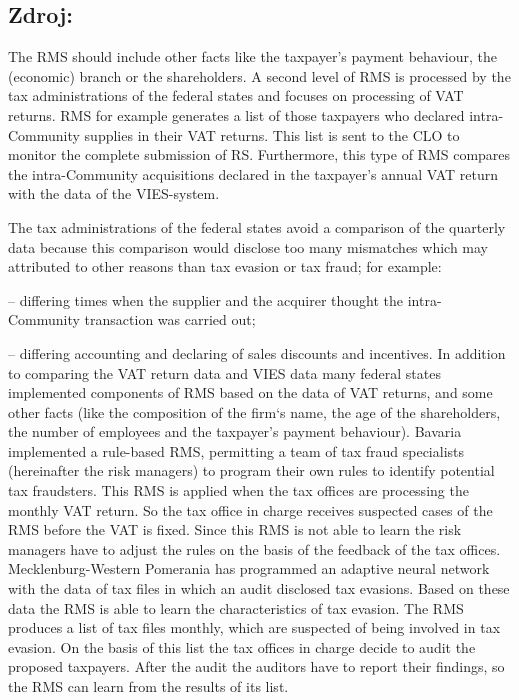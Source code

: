 \documentclass[10pt]{article}
\begin{document}
\subsection*{Zdroj:}

The RMS should include other facts like the taxpayer’s payment behaviour, the (economic) branch or the shareholders.
A second level of RMS is processed by the tax administrations of the federal states and focuses on processing of VAT returns.
RMS for example generates a list of those taxpayers who declared intra-Community supplies in their VAT returns.
This list is sent to the CLO to monitor the complete submission of RS.
Furthermore, this type of RMS compares the intra-Community acquisitions declared in the taxpayer’s annual VAT return with the data of the VIES-system.


The tax administrations of the federal states avoid a comparison of the quarterly data because this comparison would disclose too many mismatches which may attributed to other reasons than tax evasion or tax fraud; for example:



– differing times when the supplier and the acquirer thought the intra-Community transaction was carried out;

– differing accounting and declaring of sales discounts and incentives.
In addition to comparing the VAT return data and VIES data many federal states implemented components of RMS based on the data of VAT returns, and some other facts (like the composition of the firm‘s name, the age of the shareholders, the number of employees and the taxpayer’s payment behaviour).
Bavaria implemented a rule-based RMS, permitting a team of tax fraud specialists (hereinafter the risk managers) to program their own rules to identify potential tax fraudsters.
This RMS is applied when the tax offices are processing the monthly VAT return.
So the tax office in charge receives suspected cases of the RMS before the VAT is fixed.
Since this RMS is not able to learn the risk managers have to adjust the rules on the basis of the feedback of the tax offices.
Mecklenburg-Western Pomerania has programmed an adaptive neural network with the data of tax files in which an audit disclosed tax evasions.
Based on these data the RMS is able to learn the characteristics of tax evasion.
The RMS produces a list of tax files monthly, which are suspected of being involved in tax evasion.
On the basis of this list the tax offices in charge decide to audit the proposed taxpayers.
After the audit the auditors have to report their findings, so the RMS can learn from the results of its list.
\end{document}
